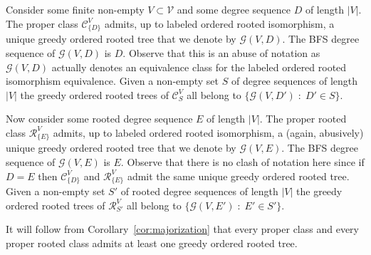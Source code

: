 \documentclass[11 pt]{modarticle}
\newcommand{\vset}{\mathcal{V}}
\newcommand{\size}[1]{|#1|}
\newcommand{\tclass}{\mathcal{C}}
\newcommand{\rtclass}{\mathcal{R}}
\newcommand{\greedy}[2]{\mathcal{G}(#1,#2)}
\newcommand{\pclass}[2]{\tclass^{#1}_{#2}}
\newcommand{\rpclass}[2]{\rtclass^{#1}_{#2}}
\begin{document}
Consider some finite non-empty $V \subset \vset$ and some degree sequence $D$ of length $\size{V}$. The proper class $\pclass{V}{\{D\}}$ admits, up to labeled ordered rooted isomorphism, a unique greedy ordered rooted tree that we denote by $\greedy{V}{D}$. The BFS degree sequence of $\greedy{V}{D}$ is $D$. Observe that this is an abuse of notation as $\greedy{V}{D}$ actually denotes an equivalence class for the labeled ordered rooted isomorphism equivalence. Given a non-empty set $S$ of degree sequences of length $\size{V}$ the greedy ordered rooted trees of $\pclass{V}{S}$ all belong to $\{\greedy{V}{D'} \;:\; D' \in S\}$.

Now consider some rooted degree sequence $E$ of length $\size{V}$. The proper rooted class $\rpclass{V}{\{E\}}$ admits, up to labeled ordered rooted isomorphism, a (again, abusively) unique greedy ordered rooted tree that we denote by $\greedy{V}{E}$. The BFS degree sequence of $\greedy{V}{E}$ is $E$. Observe that there is no clash of notation here since if $D = E$ then $\pclass{V}{\{D\}}$ and $\rpclass{V}{\{E\}}$ admit the same unique greedy ordered rooted tree. Given a non-empty set $S'$ of rooted degree sequences of length $\size{V}$ the greedy ordered rooted trees of $\rpclass{V}{S'}$ all belong to $\{\greedy{V}{E'} \;:\; E' \in S'\}$. 

It will follow from Corollary~\ref{cor:majorization} that every proper class and every proper rooted class admits at least one greedy ordered rooted tree.
\end{document}
